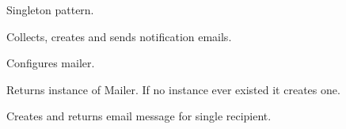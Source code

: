\documentclass[letterpaper,10pt,english]{sphinxmanual}
\begin{document}

\begin{fulllineitems}
Singleton pattern.

Collects, creates and sends notification emails.

\begin{fulllineitems}
\label{index:spy.Mailer.NotSingle}
\end{fulllineitems}


\begin{fulllineitems}
\label{index:spy.Mailer._Mailer__instance}
\end{fulllineitems}


\begin{fulllineitems}
\label{index:spy.Mailer.configure}
Configures mailer.

\end{fulllineitems}


\begin{fulllineitems}
\label{index:spy.Mailer.get_instance}
Returns instance of Mailer.
If no instance ever existed it creates one.

\end{fulllineitems}


\begin{fulllineitems}
\label{index:spy.Mailer.make_email}
Creates and returns email message for single recipient.

\end{fulllineitems}



\end{fulllineitems}
\end{document}
